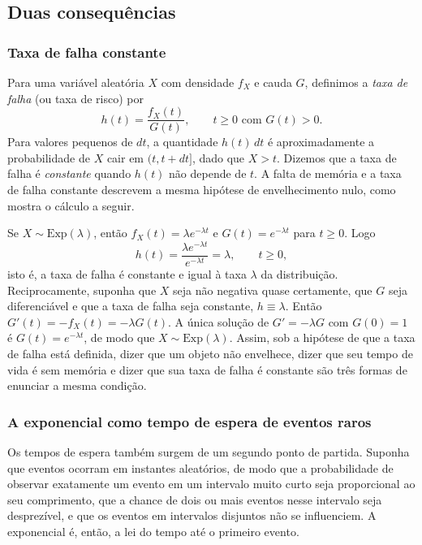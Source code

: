 \subsection{Duas consequências}

\subsubsection{Taxa de falha constante}

Para uma variável aleatória $X$ com densidade $f_X$ e cauda $G$, definimos a
\emph{taxa de falha} (ou taxa de risco) por
\[
  h(t)=\frac{f_X(t)}{G(t)},
  \qquad t\geqslant 0 \text{ com } G(t)>0.
\]
Para valores pequenos de $dt$, a quantidade $h(t)\,dt$ é aproximadamente a
probabilidade de $X$ cair em $(t,t+dt]$, dado que $X>t$. Dizemos que a taxa
de falha é \emph{constante} quando $h(t)$ não depende de $t$. A falta de
memória e a taxa de falha constante descrevem a mesma hipótese de
envelhecimento nulo, como mostra o cálculo a seguir.

\begin{example}\label{ex:taxa-falha-exponencial}
Se $X\sim\mathrm{Exp}(\lambda)$, então $f_X(t)=\lambda e^{-\lambda t}$ e
$G(t)=e^{-\lambda t}$ para $t\geqslant 0$. Logo
\[
  h(t)=\frac{\lambda e^{-\lambda t}}{e^{-\lambda t}}=\lambda,
  \qquad t\geqslant 0,
\]
isto é, a taxa de falha é constante e igual à taxa $\lambda$ da
distribuição. Reciprocamente, suponha que $X$ seja não negativa quase
certamente, que $G$ seja diferenciável e que a taxa de falha seja constante,
$h\equiv\lambda$. Então $G'(t)=-f_X(t)=-\lambda G(t)$. A única solução de
$G'=-\lambda G$ com $G(0)=1$ é $G(t)=e^{-\lambda t}$, de modo que
$X\sim\mathrm{Exp}(\lambda)$. Assim, sob a hipótese de que a taxa de falha
está definida, dizer que um objeto não envelhece, dizer que seu tempo de vida
é sem memória e dizer que sua taxa de falha é constante são três formas de
enunciar a mesma condição.
\end{example}

\subsubsection{A exponencial como tempo de espera de eventos raros}

Os tempos de espera também surgem de um segundo ponto de partida. Suponha
que eventos ocorram em instantes aleatórios, de modo que a probabilidade de
observar exatamente um evento em um intervalo muito curto seja proporcional
ao seu comprimento, que a chance de dois ou mais eventos nesse intervalo seja
desprezível, e que os eventos em intervalos disjuntos não se influenciem.
A exponencial é, então, a lei do tempo até o primeiro evento.

